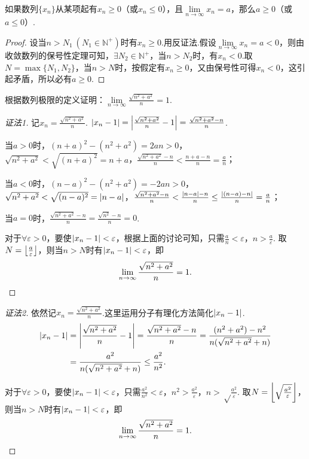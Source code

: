 \begin{corollary}
如果数列\(\{x_n\}\)从某项起有\(x_n \geq 0\)（或\(x_n \leq 0\)），且\(\lim\limits_{n\to\infty}x_n = a\)，那么\(a \geq 0\)（或\(a \leq 0\)）.
\begin{proof}
设当\(n > N_1\ (N_1 \in \mathbb{N}^+)\)时有\(x_n \geq 0\).用反证法.假设\(\lim\limits_{n\to\infty}x_n = a < 0\)，则由收敛数列的保号性定理可知，\(\exists N_2 \in \mathbb{N}^+\)，当\(n > N_2\)时，有\(x_n < 0\).取\(N = \max\{N_1,N_2\}\)，当\(n > N\)时，按假定有\(x_n \geq 0\)，又由保号性可得\(x_n < 0\)，这引起矛盾，所以必有\(a \geq 0\).
\end{proof}
\end{corollary}

\begin{example}
\def\l{\lim\limits_{n\to\infty}}
\def\ys{\l \frac{\sqrt{n^2+a^2}}{n}}
根据数列极限的定义证明：\(\ys = 1\).
\begin{proof}[证法1]
记\(x_n = \frac{\sqrt{n^2+a^2}}{n}\).
\(\abs{x_n-1} = \abs{\frac{\sqrt{n^2+a^2}}{n}-1} = \frac{\sqrt{n^2+a^2}-n}{n}\).

当\(a > 0\)时，\((n+a)^2-(n^2+a^2)=2an>0\)，\(\sqrt{n^2+a^2}<\sqrt{(n+a)^2}=n+a\)，\(\frac{\sqrt{n^2+a^2}-n}{n} < \frac{n+a-n}{n} = \frac{a}{n}\)；

当\(a < 0\)时，\((n-a)^2-(n^2+a^2)=-2an>0\)，\(\sqrt{n^2+a^2}<\sqrt{(n-a)^2}=\abs{n-a}\)，\(\frac{\sqrt{n^2+a^2}-n}{n} < \frac{\abs{n-a}-n}{n} \leq \frac{\abs{(n-a)-n}}{n} = \frac{a}{n}\)；

当\(a = 0\)时，\(\frac{\sqrt{n^2+a^2}-n}{n} = \frac{\sqrt{n^2}-n}{n} = 0\).

对于\(\forall\varepsilon>0\)，要使\(\abs{x_n-1}<\varepsilon\)，根据上面的讨论可知，只需\(\frac{a}{n}<\varepsilon\)，\(n>\frac{a}{\varepsilon}\).
取\(N = \floor*{\frac{a}{\varepsilon}}\)，则当\(n>N\)时有\(\abs{x_n-1}<\varepsilon\)，即\[
\ys = 1.
\qedhere
\]
\end{proof}
\begin{proof}[证法2]
依然记\(x_n = \frac{\sqrt{n^2+a^2}}{n}\).这里运用分子有理化方法简化\(\abs{x_n-1}\).
\begin{align*}
\abs{x_n-1} &= \abs{\frac{\sqrt{n^2+a^2}}{n}-1}
= \frac{\sqrt{n^2+a^2}-n}{n}
= \frac{(n^2+a^2)-n^2}{n (\sqrt{n^2+a^2}+n)} \\
&= \frac{a^2}{n (\sqrt{n^2+a^2}+n)}
\leq \frac{a^2}{n^2}.
\end{align*}

对于\(\forall\varepsilon>0\)，要使\(\abs{x_n-1}<\varepsilon\)，只需\(\frac{a^2}{n^2}<\varepsilon\)，\(n^2>\frac{a^2}{\varepsilon}\)，\(n>\sqrt\frac{a^2}{\varepsilon}\).
取\(N = \floor*{\sqrt\frac{a^2}{\varepsilon}}\)，则当\(n>N\)时有\(\abs{x_n-1}<\varepsilon\)，即\[
\ys = 1.
\qedhere
\]
\end{proof}
\end{example}

